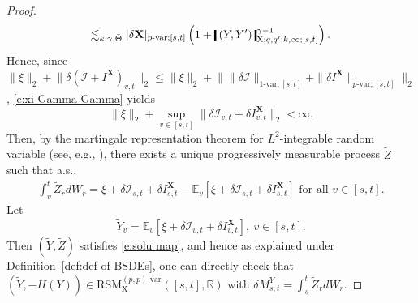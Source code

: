 \documentclass[11pt,reqno]{amsart}
\numberwithin{equation}{section}
\def\R{\mathbb R}
\newcommand{\shortthickbar}{%
  \vcenter{\hbox{\rule{1.8pt}{2.2ex}}}%
}
\newcommand{\thicknm}[1]{%
  \mathopen{\shortthickbar}%
  \mkern4mu #1 \mkern4mu%
  \mathclose{\shortthickbar}%
}
\begin{document}
\begin{proof}
\begin{equation*}
\begin{aligned}
\lesssim_{k,\gamma,\bar \Theta} |\delta \mathbf X|_{p\text{-}\mathrm{var};[s,t]} \left( 1 + \thicknm{(Y,Y')}^{\gamma - 1}_{\mathrm X;q,q';k,\infty;[s,t]} \right). 
\end{aligned}
\end{equation*}
Hence, since $\|\xi\|_2 + \big\|\delta (\mathcal I +  I^{\mathbf X})_{v,t} \big\|_2 \le \|\xi\|_2 + \big\| \|\delta \mathcal I\|_{1\text{-}\mathrm{var};[s,t]} + \|\delta I^{\mathbf X}\|_{p\text{-}\mathrm{var};[s,t]} \big\|_2$, \eqref{e:xi Gamma Gamma} yields 
\begin{equation*}
\|\xi\|_2 + \sup_{v \in [s,t]}\big\|\delta \mathcal I_{v,t} + \delta I^{\mathbf X}_{v,t} \big\|_2 < \infty.
\end{equation*}
Then, by the martingale representation theorem for $L^2$-integrable random variable (see, e.g., \cite[Problem~4.17]{karatzas1991brownian}), there exists a unique progressively measurable
process $\tilde Z$ such that a.s., 
\begin{align*}
\int_v^t \tilde Z_{r} dW_r = \xi + \delta \mathcal I_{s,t} + \delta I^{\mathbf X}_{s,t} - \mathbb{E}_v\left[\xi + \delta \mathcal I_{s,t} + \delta I^{\mathbf X}_{s,t}\right]\text{ for all }v\in[s,t].
\end{align*}
Let 
\begin{equation}\label{e:tilde-Y}
\tilde{Y}_{v} = \mathbb{E}_{v}\left[\xi + \delta \mathcal I_{v,t} + \delta I^{\mathbf X}_{v,t} \right],~ v \in [s,t].
\end{equation}
Then $(\tilde Y, \tilde Z)$ satisfies \eqref{e:solu map}, and hence as explained under Definition~\ref{def:def of BSDEs}, one can directly check that $(\tilde Y, -H(Y)) \in \mathrm{RSM}^{(p,p)\text{-}\mathrm{var}}_{\mathrm X}([s,t],\R)$ with $\delta M^{\tilde Y}_{s,t} = \int_{s}^t \tilde Z_r dW_r$. 


\end{proof}
\end{document}
